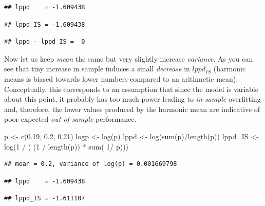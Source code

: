 \documentclass[
]{book}
\newenvironment{Shaded}{\begin{snugshade}}{\end{snugshade}}
\newcommand{\DecValTok}[1]{\textcolor[rgb]{0.00,0.00,0.81}{#1}}
\newcommand{\FloatTok}[1]{\textcolor[rgb]{0.00,0.00,0.81}{#1}}
\newcommand{\FunctionTok}[1]{\textcolor[rgb]{0.00,0.00,0.00}{#1}}
\newcommand{\NormalTok}[1]{#1}
\newcommand{\OtherTok}[1]{\textcolor[rgb]{0.56,0.35,0.01}{#1}}
\newcommand{\SpecialCharTok}[1]{\textcolor[rgb]{0.00,0.00,0.00}{#1}}
\begin{document}
\begin{verbatim}
## lppd    = -1.609438
\end{verbatim}

\begin{verbatim}
## lppd_IS = -1.609438
\end{verbatim}

\begin{verbatim}
## lppd - lppd_IS =  0
\end{verbatim}

Now let us keep \emph{mean} the same but very slightly increase \emph{variance}. As you can see that tiny increase in sample induces a small \emph{decrease} in \(lppd_{IS}\) (harmonic means is biased towards lower numbers compared to an arithmetic mean). Conceptually, this corresponds to an assumption that since the model is variable about this point, it probably has too much power leading to \emph{in-sample} overfitting and, therefore, the lower values produced by the harmonic mean are indicative of poor expected \emph{out-of-sample} performance.

\begin{Shaded}
\begin{Highlighting}[]
\NormalTok{p }\OtherTok{\textless{}{-}} \FunctionTok{c}\NormalTok{(}\FloatTok{0.19}\NormalTok{, }\FloatTok{0.2}\NormalTok{, }\FloatTok{0.21}\NormalTok{)}
\NormalTok{logp }\OtherTok{\textless{}{-}} \FunctionTok{log}\NormalTok{(p)}
\NormalTok{lppd }\OtherTok{\textless{}{-}} \FunctionTok{log}\NormalTok{(}\FunctionTok{sum}\NormalTok{(p)}\SpecialCharTok{/}\FunctionTok{length}\NormalTok{(p))}
\NormalTok{lppd\_IS }\OtherTok{\textless{}{-}} \FunctionTok{log}\NormalTok{(}\DecValTok{1} \SpecialCharTok{/}\NormalTok{ ( (}\DecValTok{1} \SpecialCharTok{/} \FunctionTok{length}\NormalTok{(p)) }\SpecialCharTok{*} \FunctionTok{sum}\NormalTok{( }\DecValTok{1}\SpecialCharTok{/}\NormalTok{ p)))}
\end{Highlighting}
\end{Shaded}

\begin{verbatim}
## mean = 0.2, variance of log(p) = 0.001669798
\end{verbatim}

\begin{verbatim}
## lppd    = -1.609438
\end{verbatim}

\begin{verbatim}
## lppd_IS = -1.611107
\end{verbatim}
\end{document}
